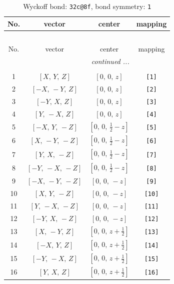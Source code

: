\documentclass[fleqn,8pt]{jsarticle}
\begin{document}
\begin{longtable}{cccc}
\caption{Wyckoff bond: {\tt 32c@8f}, bond symmetry: {\tt 1}}
 \\
 \hline \hline
No. & vector & center & mapping \\ \hline \endfirsthead

\multicolumn{3}{l}{\tablename\ \thetable{}} \\
 \hline \hline
No. & vector & center & mapping \\ \hline \endhead

 \hline \hline
\multicolumn{3}{r}{\footnotesize\it continued ...} \\ \endfoot

 \hline \hline
\multicolumn{3}{r}{} \\ \endlastfoot

1 & $\left[ X,\, Y,\, Z \right]$ & $\left[ 0,\, 0,\, z \right]$ & {\tt [1]} \\ \hline
2 & $\left[ - X,\, - Y,\, Z \right]$ & $\left[ 0,\, 0,\, z \right]$ & {\tt [2]} \\ \hline
3 & $\left[ - Y,\, X,\, Z \right]$ & $\left[ 0,\, 0,\, z \right]$ & {\tt [3]} \\ \hline
4 & $\left[ Y,\, - X,\, Z \right]$ & $\left[ 0,\, 0,\, z \right]$ & {\tt [4]} \\ \hline
5 & $\left[ - X,\, Y,\, - Z \right]$ & $\left[ 0,\, 0,\, \frac{1}{2} - z \right]$ & {\tt [5]} \\ \hline
6 & $\left[ X,\, - Y,\, - Z \right]$ & $\left[ 0,\, 0,\, \frac{1}{2} - z \right]$ & {\tt [6]} \\ \hline
7 & $\left[ Y,\, X,\, - Z \right]$ & $\left[ 0,\, 0,\, \frac{1}{2} - z \right]$ & {\tt [7]} \\ \hline
8 & $\left[ - Y,\, - X,\, - Z \right]$ & $\left[ 0,\, 0,\, \frac{1}{2} - z \right]$ & {\tt [8]} \\ \hline
9 & $\left[ - X,\, - Y,\, - Z \right]$ & $\left[ 0,\, 0,\, - z \right]$ & {\tt [9]} \\ \hline
10 & $\left[ X,\, Y,\, - Z \right]$ & $\left[ 0,\, 0,\, - z \right]$ & {\tt [10]} \\ \hline
11 & $\left[ Y,\, - X,\, - Z \right]$ & $\left[ 0,\, 0,\, - z \right]$ & {\tt [11]} \\ \hline
12 & $\left[ - Y,\, X,\, - Z \right]$ & $\left[ 0,\, 0,\, - z \right]$ & {\tt [12]} \\ \hline
13 & $\left[ X,\, - Y,\, Z \right]$ & $\left[ 0,\, 0,\, z + \frac{1}{2} \right]$ & {\tt [13]} \\ \hline
14 & $\left[ - X,\, Y,\, Z \right]$ & $\left[ 0,\, 0,\, z + \frac{1}{2} \right]$ & {\tt [14]} \\ \hline
15 & $\left[ - Y,\, - X,\, Z \right]$ & $\left[ 0,\, 0,\, z + \frac{1}{2} \right]$ & {\tt [15]} \\ \hline
16 & $\left[ Y,\, X,\, Z \right]$ & $\left[ 0,\, 0,\, z + \frac{1}{2} \right]$ & {\tt [16]} \\
\end{longtable}
\end{document}
